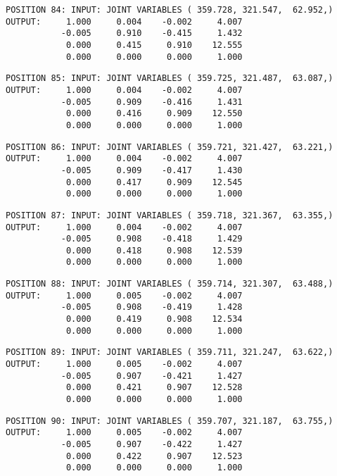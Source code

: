 \begin{verbatim}
POSITION 84: INPUT: JOINT VARIABLES ( 359.728, 321.547,  62.952,)
OUTPUT:     1.000     0.004    -0.002     4.007
           -0.005     0.910    -0.415     1.432
            0.000     0.415     0.910    12.555
            0.000     0.000     0.000     1.000
\end{verbatim} \pagebreak[1]\begin{verbatim}
POSITION 85: INPUT: JOINT VARIABLES ( 359.725, 321.487,  63.087,)
OUTPUT:     1.000     0.004    -0.002     4.007
           -0.005     0.909    -0.416     1.431
            0.000     0.416     0.909    12.550
            0.000     0.000     0.000     1.000
\end{verbatim} \pagebreak[1]\begin{verbatim}
POSITION 86: INPUT: JOINT VARIABLES ( 359.721, 321.427,  63.221,)
OUTPUT:     1.000     0.004    -0.002     4.007
           -0.005     0.909    -0.417     1.430
            0.000     0.417     0.909    12.545
            0.000     0.000     0.000     1.000
\end{verbatim} \pagebreak[1]\begin{verbatim}
POSITION 87: INPUT: JOINT VARIABLES ( 359.718, 321.367,  63.355,)
OUTPUT:     1.000     0.004    -0.002     4.007
           -0.005     0.908    -0.418     1.429
            0.000     0.418     0.908    12.539
            0.000     0.000     0.000     1.000
\end{verbatim} \pagebreak[1]\begin{verbatim}
POSITION 88: INPUT: JOINT VARIABLES ( 359.714, 321.307,  63.488,)
OUTPUT:     1.000     0.005    -0.002     4.007
           -0.005     0.908    -0.419     1.428
            0.000     0.419     0.908    12.534
            0.000     0.000     0.000     1.000
\end{verbatim} \pagebreak[1]\begin{verbatim}
POSITION 89: INPUT: JOINT VARIABLES ( 359.711, 321.247,  63.622,)
OUTPUT:     1.000     0.005    -0.002     4.007
           -0.005     0.907    -0.421     1.427
            0.000     0.421     0.907    12.528
            0.000     0.000     0.000     1.000
\end{verbatim} \pagebreak[1]\begin{verbatim}
POSITION 90: INPUT: JOINT VARIABLES ( 359.707, 321.187,  63.755,)
OUTPUT:     1.000     0.005    -0.002     4.007
           -0.005     0.907    -0.422     1.427
            0.000     0.422     0.907    12.523
            0.000     0.000     0.000     1.000
\end{verbatim} \pagebreak[1]\begin{verbatim}

\end{verbatim}
